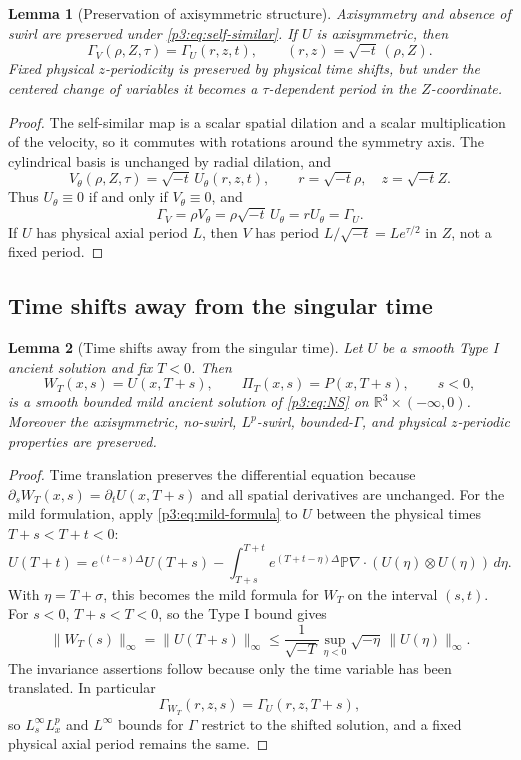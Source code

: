 \documentclass[11pt]{amsart}
\theoremstyle{plain}
\newtheorem{lemma}[lemma]{Lemma}
\theoremstyle{definition}
\theoremstyle{remark}
\numberwithin{equation}{section}
\begin{document}
\begin{lemma}[Preservation of axisymmetric structure]
\label{p3:lem:structure-preserved}
Axisymmetry and absence of swirl are preserved under
\eqref{p3:eq:self-similar}.  If \(U\) is axisymmetric, then
\[
   \Gamma_V(\rho,Z,\tau)=\Gamma_U(r,z,t),
   \qquad
   (r,z)=\sqrt{-t}\,(\rho,Z).
\]
Fixed physical \(z\)-periodicity is preserved by physical time shifts, but
under the centered change of variables it becomes a \(\tau\)-dependent period
in the \(Z\)-coordinate.
\end{lemma}

\begin{proof}
The self-similar map is a scalar spatial dilation and a scalar multiplication
of the velocity, so it commutes with rotations around the symmetry axis.
The cylindrical basis is unchanged by radial dilation, and
\[
   V_\theta(\rho,Z,\tau)
   =
   \sqrt{-t}\,U_\theta(r,z,t),
   \qquad
   r=\sqrt{-t}\rho,\quad z=\sqrt{-t}Z .
\]
Thus \(U_\theta\equiv0\) if and only if \(V_\theta\equiv0\), and
\[
   \Gamma_V=\rho V_\theta
   =
   \rho\sqrt{-t}\,U_\theta
   =
   rU_\theta
   =
   \Gamma_U .
\]
If \(U\) has physical axial period \(L\), then \(V\) has period
\(L/\sqrt{-t}=Le^{\tau/2}\) in \(Z\), not a fixed period.
\end{proof}

\subsection{Time shifts away from the singular time}

\begin{lemma}[Time shifts away from the singular time]
\label{p3:lem:time-shift}
Let \(U\) be a smooth Type I ancient solution and fix \(T<0\).  Then
\[
   W_T(x,s)=U(x,T+s),\qquad \Pi_T(x,s)=P(x,T+s),\qquad s<0,
\]
is a smooth bounded mild ancient solution of \eqref{p3:eq:NS} on
\(\mathbb R^3\times(-\infty,0)\).  Moreover the axisymmetric, no-swirl,
\(L^p\)-swirl, bounded-\(\Gamma\), and physical \(z\)-periodic properties are
preserved.
\end{lemma}

\begin{proof}
Time translation preserves the differential equation because
\(\partial_sW_T(x,s)=\partial_tU(x,T+s)\) and all spatial derivatives are
unchanged.  For the mild formulation, apply \eqref{p3:eq:mild-formula} to \(U\)
between the physical times \(T+s<T+t<0\):
\[
   U(T+t)=e^{(t-s)\Delta}U(T+s)
   -\int_{T+s}^{T+t}e^{(T+t-\eta)\Delta}\mathbb P\nabla\cdot
      (U(\eta)\otimes U(\eta))\,d\eta .
\]
With \(\eta=T+\sigma\), this becomes the mild formula for \(W_T\) on the
interval \((s,t)\).  For \(s<0\), \(T+s<T<0\), so the Type I bound gives
\[
   \|W_T(s)\|_\infty
   =
   \|U(T+s)\|_\infty
   \le
   \frac1{\sqrt{-T}}
   \sup_{\eta<0}\sqrt{-\eta}\,\|U(\eta)\|_\infty .
\]
The invariance assertions follow because only the time variable has been
translated.  In particular
\[
   \Gamma_{W_T}(r,z,s)=\Gamma_U(r,z,T+s),
\]
so \(L_s^\infty L_x^p\) and \(L^\infty\) bounds for \(\Gamma\) restrict to the
shifted solution, and a fixed physical axial period remains the same.
\end{proof}
\end{document}
